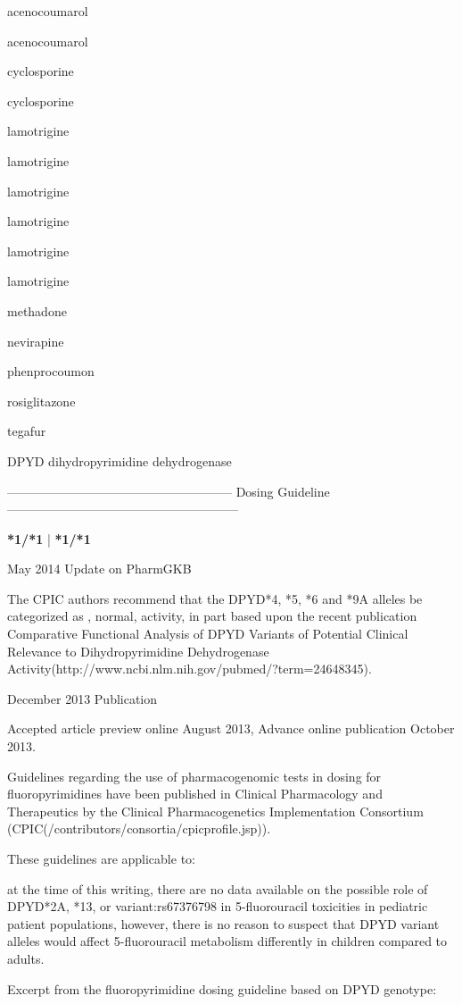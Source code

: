 \documentclass{resume} %
\begin{document}
\begin{rSection}{ acenocoumarol }
\begin{rSection}{ acenocoumarol }
\begin{rSection}{ cyclosporine }
\begin{rSection}{ cyclosporine }
\begin{rSection}{ lamotrigine }
\begin{rSection}{ lamotrigine }
\begin{rSection}{ lamotrigine }
\begin{rSection}{ lamotrigine }
\begin{rSection}{ lamotrigine }
\begin{rSection}{ lamotrigine }
\begin{rSection}{ methadone }
\begin{rSection}{ nevirapine }
\begin{rSection}{ phenprocoumon }
\begin{rSection}{ rosiglitazone }
\end{rSection}\begin{rSection}{ tegafur }
\item[]
\begin{rSubsection}{ DPYD }{ dihydropyrimidine dehydrogenase }{}{}
\item[]
\item[] ------------------------------------------------------ Dosing Guideline --------------------------------------------------------\newline
\item[]
\item[] \textbf{ *1/*1 } | \textbf{ *1/*1 }
\item May 2014 Update on PharmGKB
 \newline
\item The CPIC authors recommend that the DPYD*4, *5, *6 and *9A alleles be categorized as , normal,  activity, in part based upon the recent publication Comparative Functional Analysis of DPYD Variants of Potential Clinical Relevance to Dihydropyrimidine Dehydrogenase Activity(http://www.ncbi.nlm.nih.gov/pubmed/?term=24648345). 
 \newline
\item December 2013 Publication
 \newline
\item Accepted article preview online August 2013,  Advance online publication October 2013.
 \newline
\item Guidelines regarding the use of pharmacogenomic tests in dosing for fluoropyrimidines have been published in Clinical Pharmacology and Therapeutics by the Clinical Pharmacogenetics Implementation Consortium (CPIC(/contributors/consortia/cpicprofile.jsp)).
 \newline
\item These guidelines are applicable to:
 \newline
\item at the time of this writing, there are no data available on the possible role of DPYD*2A, *13, or variant:rs67376798 in 5-fluorouracil toxicities in pediatric patient populations,  however, there is no reason to suspect that DPYD variant alleles would affect 5-fluorouracil metabolism differently in children compared to adults.
 \newline
\item Excerpt from the fluoropyrimidine dosing guideline based on DPYD genotype:
 \newline

\end{rSubsection}
\end{rSection}
\end{rSection}
\end{rSection}
\end{rSection}
\end{rSection}
\end{rSection}
\end{rSection}
\end{rSection}
\end{rSection}
\end{rSection}
\end{rSection}
\end{rSection}
\end{rSection}
\end{rSection}
\end{document}
